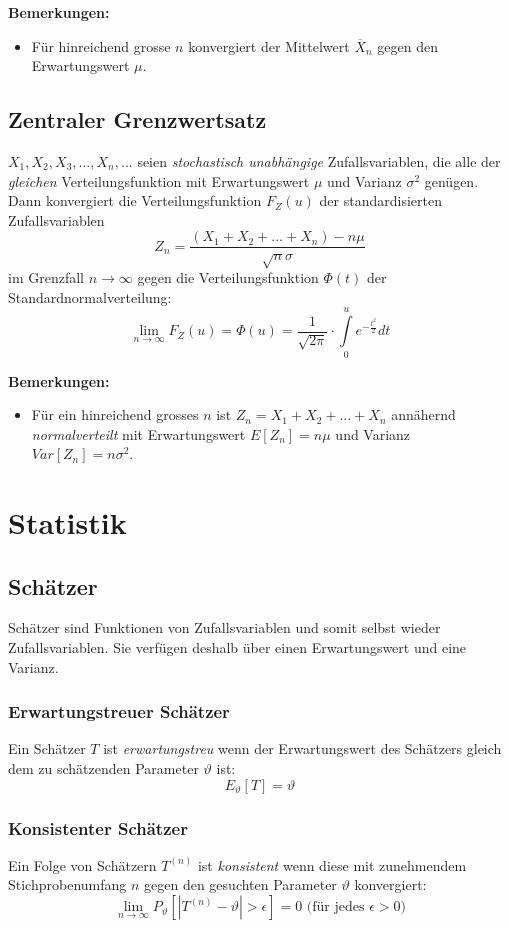 \documentclass[10pt,a4paper,twocolumn]{article}
\begin{document}
\textbf{Bemerkungen:}
\begin{itemize}
\item Für hinreichend grosse $n$ konvergiert der Mittelwert $\overline{X}_n$ gegen den Erwartungswert $\mu$.
\end{itemize}

\subsection{Zentraler Grenzwertsatz}
$X_1,X_2,X_3,...,X_n,...$ seien \emph{stochastisch unabhängige} Zufallsvariablen, die alle der \emph{gleichen} Verteilungsfunktion mit Erwartungswert $\mu$ und Varianz $\sigma^2$ genügen. Dann konvergiert die Verteilungsfunktion $F_Z(u)$ der standardisierten Zufallsvariablen
\[
Z_n=\frac{(X_1+X_2+...+X_n)-n\mu}{\sqrt{n}\sigma}
\]
im Grenzfall $n\rightarrow\infty$ gegen die Verteilungsfunktion $\Phi(t)$ der Standardnormalverteilung:
\[
\lim_{n\to\infty}F_Z(u)=\Phi(u)=\frac{1}{\sqrt{2\pi}}\cdot\int\limits_{0}^{u}e^{-\frac{t^2}{2}}dt
\]

\textbf{Bemerkungen:}
\begin{itemize}
\item Für ein hinreichend grosses $n$ ist $Z_n=X_1+X_2+...+X_n$ annähernd \emph{normalverteilt} mit Erwartungswert $E[Z_n]=n\mu$ und Varianz $Var[Z_n]=n\sigma^2$.
\end{itemize}

\section{Statistik}

\subsection{Schätzer}
Schätzer sind Funktionen von Zufallsvariablen und somit selbst wieder Zufallsvariablen. Sie verfügen deshalb über einen Erwartungswert und eine Varianz.

\subsubsection{Erwartungstreuer Schätzer}
Ein Schätzer $T$ ist \emph{erwartungstreu} wenn der Erwartungswert des Schätzers gleich dem zu schätzenden Parameter $\vartheta$ ist:
\[
E_\vartheta [T] = \vartheta
\]

\subsubsection{Konsistenter Schätzer}
Ein Folge von Schätzern $T^{(n)}$ ist \emph{konsistent} wenn diese mit zunehmendem Stichprobenumfang $n$ gegen den gesuchten Parameter $\vartheta$ konvergiert:
\[
\lim_{n\to\infty}P_{\vartheta}\left[|T^{(n)}-\vartheta| > \epsilon\right] = 0\text{ (für jedes $\epsilon > 0$)}
\]
\end{document}
